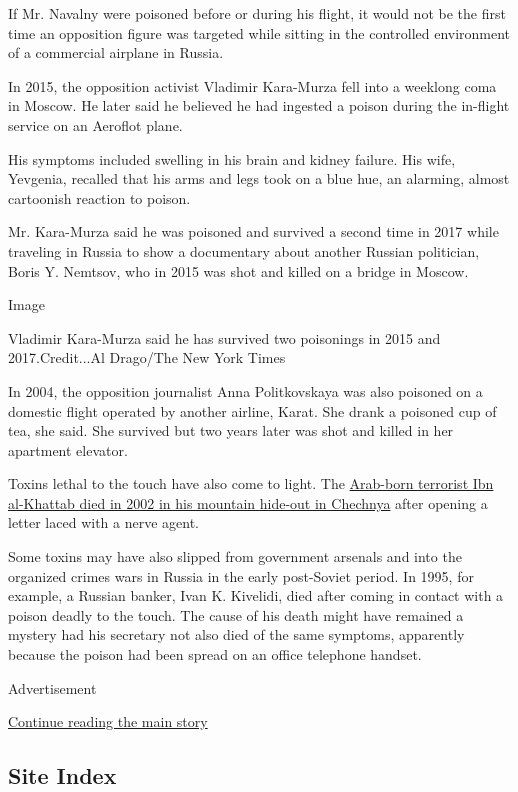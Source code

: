 If Mr. Navalny were poisoned before or during his flight, it would not
be the first time an opposition figure was targeted while sitting in the
controlled environment of a commercial airplane in Russia.

In 2015, the opposition activist Vladimir Kara-Murza fell into a
weeklong coma in Moscow. He later said he believed he had ingested a
poison during the in-flight service on an Aeroflot plane.

His symptoms included swelling in his brain and kidney failure. His
wife, Yevgenia, recalled that his arms and legs took on a blue hue, an
alarming, almost cartoonish reaction to poison.

Mr. Kara-Murza said he was poisoned and survived a second time in 2017
while traveling in Russia to show a documentary about another Russian
politician, Boris Y. Nemtsov, who in 2015 was shot and killed on a
bridge in Moscow.

Image

 Vladimir Kara-Murza said he has survived two poisonings in 2015 and
2017.Credit...Al Drago/The New York Times

In 2004, the opposition journalist Anna Politkovskaya was also poisoned
on a domestic flight operated by another airline, Karat. She drank a
poisoned cup of tea, she said. She survived but two years later was shot
and killed in her apartment elevator.

Toxins lethal to the touch have also come to light. The
\href{https://www.nytimes3xbfgragh.onion/2009/02/01/world/europe/01torture.html}{Arab-born
terrorist Ibn al-Khattab died in 2002 in his mountain hide-out in
Chechnya} after opening a letter laced with a nerve agent.

Some toxins may have also slipped from government arsenals and into the
organized crimes wars in Russia in the early post-Soviet period. In
1995, for example, a Russian banker, Ivan K. Kivelidi, died after coming
in contact with a poison deadly to the touch. The cause of his death
might have remained a mystery had his secretary not also died of the
same symptoms, apparently because the poison had been spread on an
office telephone handset.

Advertisement

\protect\hyperlink{after-bottom}{Continue reading the main story}

\hypertarget{site-index}{%
\subsection{Site Index}\label{site-index}}

